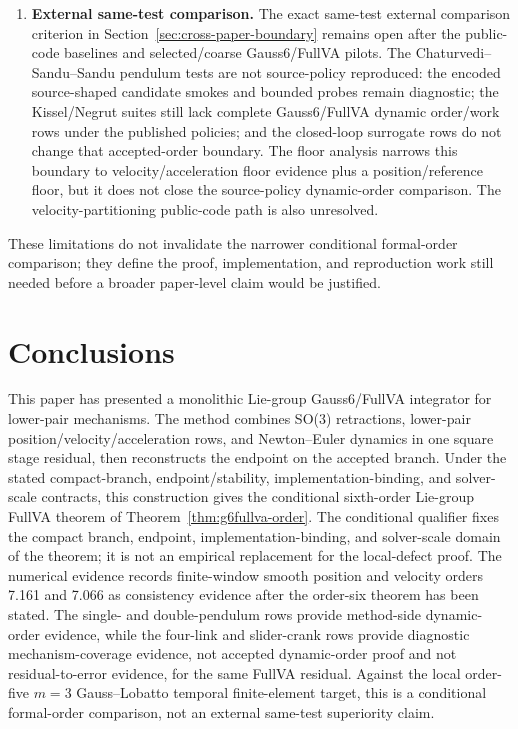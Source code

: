 \documentclass[preprint,12pt]{elsarticle}
\newcommand{\method}{Gauss6\slash FullVA}
\begin{document}
\begin{enumerate}
  the smooth contract and treats sharp friction as a quantified caveat.
  \item \textbf{External same-test comparison.} The exact same-test external
  comparison criterion in Section~\ref{sec:cross-paper-boundary} remains open
  after the public-code baselines and selected/coarse \method{} pilots.
  The Chaturvedi--Sandu--Sandu pendulum tests are not source-policy
  reproduced: the encoded source-shaped candidate smokes and bounded probes
  remain diagnostic; the Kissel/Negrut suites still lack complete \method{}
  dynamic order/work rows under the published policies; and the closed-loop
  surrogate rows do not change that accepted-order boundary. The floor
  analysis narrows this boundary to velocity/acceleration floor evidence plus
  a position/reference floor, but it does not close the source-policy
  dynamic-order comparison. The velocity-partitioning public-code path is also
  unresolved.
\end{enumerate}
These limitations do not invalidate the narrower conditional formal-order
comparison; they define the proof, implementation, and reproduction work still
needed before a broader paper-level claim would be justified.

\section{Conclusions}

This paper has presented a monolithic Lie-group Gauss6/FullVA integrator for
lower-pair mechanisms. The method combines SO(3) retractions, lower-pair
position/velocity/acceleration rows, and Newton--Euler dynamics in one
square stage residual, then reconstructs the endpoint on the accepted
branch. Under the stated compact-branch, endpoint/stability,
implementation-binding, and solver-scale contracts, this construction gives the
conditional sixth-order Lie-group FullVA theorem of
Theorem~\ref{thm:g6fullva-order}. The conditional qualifier fixes the compact
branch, endpoint, implementation-binding, and solver-scale domain of the
theorem; it is not an empirical replacement for the local-defect proof. The
numerical evidence records finite-window smooth position and velocity orders
7.161 and 7.066 as consistency evidence after the order-six theorem has been
stated. The single- and double-pendulum rows provide
method-side dynamic-order evidence, while the four-link and slider-crank rows
provide diagnostic mechanism-coverage evidence, not accepted dynamic-order
proof and not residual-to-error evidence, for the same FullVA residual.
Against the
local order-five $m=3$ Gauss--Lobatto temporal finite-element target, this is
a conditional formal-order comparison, not an external same-test superiority
claim.
\end{document}
